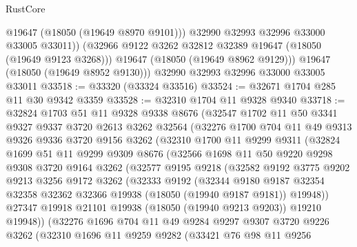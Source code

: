 \begin{lexlean}{RustCore}
\begin{coremodule}
              @19647
              (@18050 (@19649 @8970 @9101)))
            @32990
            @32993
            @32996
            @33000
            @33005
            @33011))
        (@32966 @9122 @3262 @32812 @32389 @19647 (@18050 (@19649 @9123 @3268)))
        @19647
        (@18050 (@19649 @8962 @9129)))
      @19647
      (@18050 (@19649 @8952 @9130)))
    @32990
    @32993
    @32996
    @33000
    @33005
    @33011
@33518 := @33320 (@33324 @33516)
@33524 := @32671 @1704 @285 @11 @30 @9342 @3359
@33528 := @32310 @1704 @11 @9328 @9340
@33718 := @32824
    @1703
    @51
    @11
    @9328
    @9338
    @8676
    (@32547
      @1702
      @11
      @50
      @3341
      @9327
      @9337
      @3720
      @2613
      @3262
      @32564
      (@32276
        @1700
        @704
        @11
        @49
        @9313
        @9326
        @9336
        @3720
        @9156
        @3262
        (@32310
          @1700
          @11
          @9299
          @9311
          (@32824
            @1699
            @51
            @11
            @9299
            @9309
            @8676
            (@32566
              @1698
              @11
              @50
              @9220
              @9298
              @9308
              @3720
              @9164
              @3262
              (@32577
                @9195
                @9218
                (@32582
                  @9192
                  @3775
                  @9202
                  @9213
                  @3256
                  @9172
                  @3262
                  (@32333
                    @9192
                    (@32344
                      @9180
                      @9187
                      @32354
                      @32358
                      @32362
                      @32366
                      @19938
                      (@18050 (@19940 @9187 @9181))
                      @19948))
                  @27347
                  @19918
                  @21101
                  @19938
                  (@18050 (@19940 @9213 @9203))
                  @19210
                  @19948))
              (@32276
                @1696
                @704
                @11
                @49
                @9284
                @9297
                @9307
                @3720
                @9226
                @3262
                (@32310
                  @1696
                  @11
                  @9259
                  @9282
                  (@33421
                    @76
                    @98
                    @11
                    @9256

\end{coremodule}
\end{lexlean}
